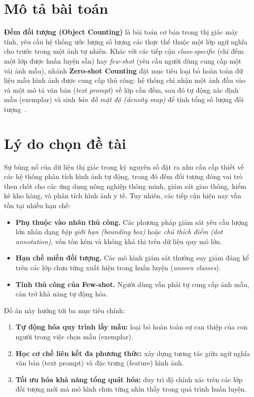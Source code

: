 \documentclass[a4paper,12pt]{report}
\numberwithin{figure}{chapter}
\numberwithin{table}{chapter}
\begin{document}
\section{Mô tả bài toán}
\textbf{Đếm đối tượng (Object Counting)} là bài toán cơ bản trong thị giác máy tính, yêu cầu hệ thống ước lượng số lượng các thực thể thuộc một lớp ngữ nghĩa cho trước trong một ảnh tự nhiên. Khác với các tiếp cận \textit{class-specific} (chỉ đếm một lớp được huấn luyện sẵn) hay \textit{few-shot} (yêu cầu người dùng cung cấp một vài ảnh mẫu), nhánh \textbf{Zero-shot Counting} đặt mục tiêu loại bỏ hoàn toàn dữ liệu mẫu hình ảnh được cung cấp thủ công: hệ thống chỉ nhận một ảnh đầu vào và một mô tả văn bản (\textit{text prompt}) về lớp cần đếm, sau đó tự động xác định mẫu (exemplar) và sinh \textit{bản đồ mật độ (density map)} để tính tổng số lượng đối tượng~\cite{vacount, richprompts}.

\section{Lý do chọn đề tài}
Sự bùng nổ của dữ liệu thị giác trong kỷ nguyên số đặt ra nhu cầu cấp thiết về các hệ thống phân tích hình ảnh tự động, trong đó đếm đối tượng đóng vai trò then chốt cho các ứng dụng nông nghiệp thông minh, giám sát giao thông, kiểm kê kho hàng, và phân tích hình ảnh y tế. Tuy nhiên, các tiếp cận hiện nay vẫn tồn tại nhiều hạn chế:

\begin{itemize}
    \item \textbf{Phụ thuộc vào nhãn thủ công.} Các phương pháp giám sát yêu cầu lượng lớn nhãn dạng \textit{hộp giới hạn (bounding box)} hoặc \textit{chú thích điểm (dot annotation)}, vốn tốn kém và không khả thi trên dữ liệu quy mô lớn.
    \item \textbf{Hạn chế miền đối tượng.} Các mô hình giám sát thường suy giảm đáng kể trên các lớp chưa từng xuất hiện trong huấn luyện (\textit{unseen classes}).
    \item \textbf{Tính thủ công của Few-shot.} Người dùng vẫn phải tự cung cấp ảnh mẫu, cản trở khả năng tự động hóa.
\end{itemize}
Đồ án này hướng tới ba mục tiêu chính:

\begin{enumerate}
    \item \textbf{Tự động hóa quy trình lấy mẫu:} loại bỏ hoàn toàn sự can thiệp của con người trong việc chọn mẫu (exemplar).
    \item \textbf{Học cơ chế liên kết đa phương thức:} xây dựng tương tác giữa ngữ nghĩa văn bản (text prompt) và đặc trưng (feature) hình ảnh.
    \item \textbf{Tối ưu hóa khả năng tổng quát hóa:} duy trì độ chính xác trên các lớp đối tượng mới mà mô hình chưa từng nhìn thấy trong quá trình huấn luyện.
\end{enumerate}
\end{document}
